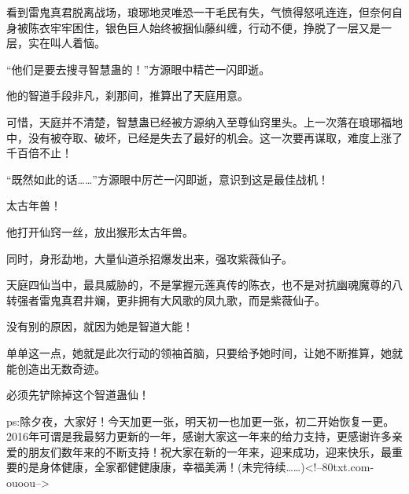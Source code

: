 \begin{this_body}
看到雷鬼真君脱离战场，琅琊地灵唯恐一干毛民有失，气愤得怒吼连连，但奈何自身被陈衣牢牢困住，银色巨人始终被捆仙藤纠缠，行动不便，挣脱了一层又是一层，实在叫人着恼。

“他们是要去搜寻智慧蛊的！”方源眼中精芒一闪即逝。

他的智道手段非凡，刹那间，推算出了天庭用意。

可惜，天庭并不清楚，智慧蛊已经被方源纳入至尊仙窍里头。上一次落在琅琊福地中，没有被夺取、破坏，已经是失去了最好的机会。这一次要再谋取，难度上涨了千百倍不止！

“既然如此的话……”方源眼中厉芒一闪即逝，意识到这是最佳战机！

太古年兽！

他打开仙窍一丝，放出猴形太古年兽。

同时，身形勐地，大量仙道杀招爆发出来，强攻紫薇仙子。

天庭四仙当中，最具威胁的，不是掌握元莲真传的陈衣，也不是对抗幽魂魔尊的八转强者雷鬼真君井斓，更非拥有大风歌的凤九歌，而是紫薇仙子。

没有别的原因，就因为她是智道大能！

单单这一点，她就是此次行动的领袖首脑，只要给予她时间，让她不断推算，她就能创造出无数奇迹。

必须先铲除掉这个智道蛊仙！

ps:除夕夜，大家好！今天加更一张，明天初一也加更一张，初二开始恢复一更。2016年可谓是我最努力更新的一年，感谢大家这一年来的给力支持，更感谢许多亲爱的朋友们数年来的不断支持！祝大家在新的一年来，迎来成功，迎来快乐，最重要的是身体健康，全家都健健康康，幸福美满！(未完待续……)<!--80txt.com-ouoou-->

\end{this_body}

